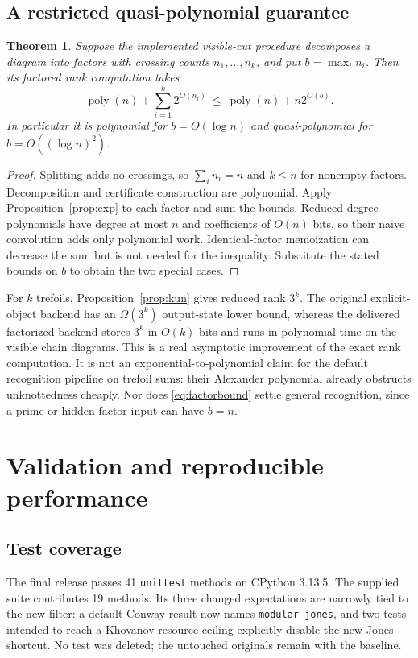 \documentclass[11pt]{article}
\newtheorem{theorem}{Theorem}[section]
\theoremstyle{remark}\newtheorem{remark}[theorem]{Remark}
\newcommand{\poly}{\operatorname{poly}}
\begin{document}
\subsection{A restricted quasi-polynomial guarantee}
\begin{theorem}\label{thm:factorbound}
Suppose the implemented visible-cut procedure decomposes a diagram into
factors with crossing counts $n_1,\ldots,n_k$, and put
$b=\max_i n_i$. Then its factored rank computation takes
\begin{equation}\label{eq:factorbound}
       \poly(n)+\sum_{i=1}^k2^{O(n_i)}
       \ \le\ \poly(n)+n2^{O(b)}.
\end{equation}
In particular it is polynomial for $b=O(\log n)$ and quasi-polynomial for
$b=O((\log n)^2)$.
\end{theorem}
\begin{proof}
Splitting adds no crossings, so $\sum_i n_i=n$ and $k\le n$ for nonempty
factors. Decomposition and certificate construction are polynomial.
Apply Proposition~\ref{prop:exp} to each factor and sum the bounds.
Reduced degree polynomials have degree at most $n$ and coefficients of
$O(n)$ bits, so their naive convolution adds only polynomial work.
Identical-factor memoization can decrease the sum but is not needed for
the inequality. Substitute the stated bounds on $b$ to obtain the two
special cases.
\end{proof}

For $k$ trefoils, Proposition~\ref{prop:kun} gives reduced rank $3^k$.
The original explicit-object backend has an $\Omega(3^k)$ output-state
lower bound, whereas the delivered factorized backend stores $3^k$ in
$O(k)$ bits and runs in polynomial time on the visible chain diagrams.
This is a real asymptotic improvement of the exact rank computation.
It is not an exponential-to-polynomial claim for the default recognition
pipeline on trefoil sums: their Alexander polynomial already obstructs
unknottedness cheaply. Nor does \eqref{eq:factorbound} settle general
recognition, since a prime or hidden-factor input can have $b=n$.

\section{Validation and reproducible performance}\label{sec:validation}
\subsection{Test coverage}
The final release passes 41 \texttt{unittest} methods on CPython 3.13.5.
The supplied suite contributes 19 methods. Its three changed expectations
are narrowly tied to the new filter: a default Conway result now names
\texttt{modular-jones}, and two tests intended to reach a Khovanov resource
ceiling explicitly disable the new Jones shortcut. No test was deleted;
the untouched originals remain with the baseline.
\end{document}
